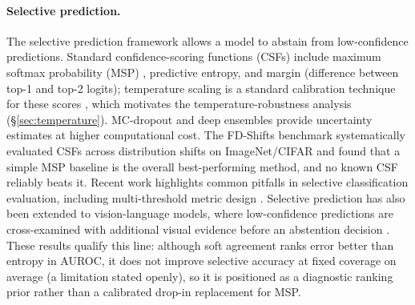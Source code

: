 \documentclass[a4paper,fleqn]{cas-sc}
\begin{document}
\paragraph{Selective prediction.}
The selective prediction framework \citep{geifman2017selective, geifman2019selectivenet, elyaniv2010foundations} allows a model to abstain from low-confidence predictions.
Standard confidence-scoring functions (CSFs) include maximum softmax probability (MSP) \citep{hendrycks2017baseline}, predictive entropy, and margin (difference between top-1 and top-2 logits); temperature scaling is a standard calibration technique for these scores \citep{guo2017temperature}, which motivates the temperature-robustness analysis (\S\ref{sec:temperature}).
MC-dropout \citep{gal2016dropout} and deep ensembles \citep{lakshminarayanan2017simple} provide uncertainty estimates at higher computational cost.
The FD-Shifts benchmark \citep{jaeger2023call} systematically evaluated CSFs across distribution shifts on ImageNet/CIFAR and found that a simple MSP baseline is the overall best-performing method, and no known CSF reliably beats it.
Recent work highlights common pitfalls in selective classification evaluation, including multi-threshold metric design \citep{luth2024overcoming}.
Selective prediction has also been extended to vision-language models, where low-confidence predictions are cross-examined with additional visual evidence before an abstention decision \citep{srinivasan2024selective}.
These results qualify this line: although soft agreement ranks error better than entropy in AUROC, it does not improve selective accuracy at fixed coverage on average (a limitation stated openly), so it is positioned as a diagnostic ranking prior rather than a calibrated drop-in replacement for MSP.
\end{document}
